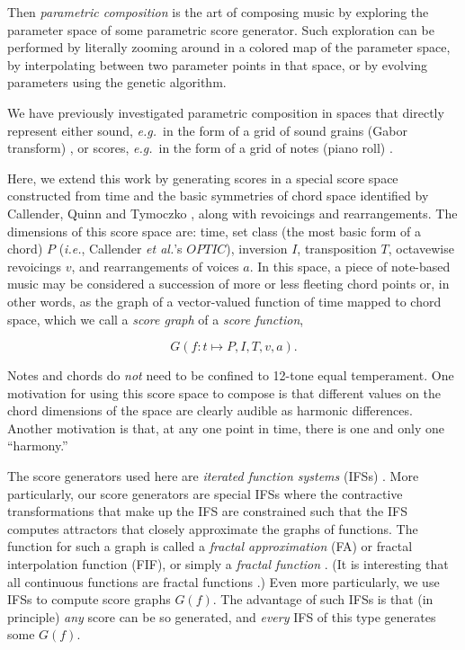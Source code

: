 \documentclass[english,11pt,letterpaper,onecolumn]{scrartcl}
\numberwithin{equation}{section}
\newcommand{\be}{\begin{equation}}
\newcommand{\ee}{\end{equation}}
\begin{document}
Then \textit{parametric composition} is the art of composing music by exploring
the parameter space of some parametric score generator. Such exploration can be
performed by literally zooming around in a colored map of the parameter space,
by interpolating between two parameter points in that space, or by evolving
parameters using the genetic algorithm.

We have previously investigated parametric composition in spaces that directly
represent either sound, \textit{e.g.}\ in the form of a grid of sound grains
(Gabor transform) \cite{obsessed}, or scores, \textit{e.g.}\ in the form of a
grid of notes (piano roll) \cite{ifsmusic}.

Here, we extend this work by generating scores in a special score space
constructed from time and the basic symmetries of chord space identified by
Callender, Quinn and Tymoczko \cite{callender:346}, along with revoicings and
rearrangements. The dimensions of this score space are: time, set class (the
most basic form of a  chord) $P$ (\textit{i.e.}, Callender \textit{et al.}'s
$OPTIC$), inversion $I$, transposition $T$, octavewise revoicings $v$, and
rearrangements of voices $a$. In this space, a piece of note-based music may be
considered a succession of more or less fleeting chord points or, in other
words, as the graph of a vector-valued function of time mapped to chord space,
which we call a \textit{score graph} of a \textit{score function},


\be \label{score_graph}
G(f: t \mapsto P, I, T, v, a).
\ee


\noindent Notes and chords do \textit{not} need to be confined to 12-tone equal
temperament. One motivation for using this score space to compose is that
different values on the chord dimensions of the space are clearly audible as
harmonic differences. Another motivation is that, at any one point in time,
there is one and only one ``harmony.''

The score generators used here are \textit{iterated function systems} (IFSs)
\cite{barnsley1985iterated, 10.2307/24893080, fractalseverywhere}. More
particularly, our score generators are special IFSs where the contractive
transformations that make up the IFS are constrained such that the IFS computes
attractors that closely approximate the graphs of functions. The function for
such a graph is called a \textit{fractal approximation} (FA) or fractal
interpolation function (FIF), or simply a \textit{fractal function}
\cite{Barnsley1986, fractalseverywhere, navascues2014fractal}. (It is
interesting that all continuous functions are fractal functions
\cite{2016arXiv161001369B}.) Even more particularly, we use IFSs to compute
score graphs $G(f)$. The advantage of such IFSs is that (in principle) \textit{any}
score can be so generated, and \textit{every} IFS of this type generates some
$G(f)$.
\end{document}
